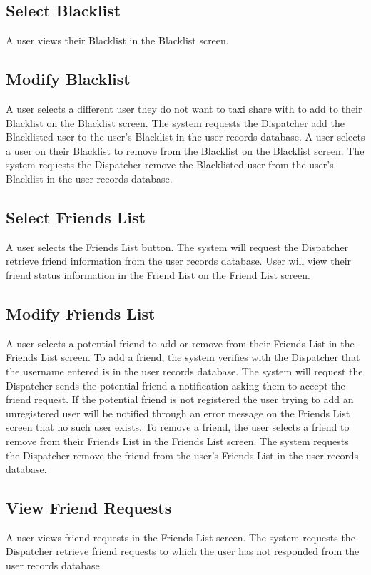\documentclass[english]{article}
\begin{document}
\subsection{Select Blacklist}
A user views their Blacklist in the Blacklist screen.
\subsection{Modify Blacklist}
A user selects a different user they do not want to taxi share with to add to their Blacklist on the Blacklist screen. The system requests the Dispatcher add the Blacklisted user to the user's Blacklist in the user records database. A user selects a user on their Blacklist to remove from the Blacklist on the Blacklist screen. The system requests the Dispatcher remove the Blacklisted user from the user's Blacklist in the user records database. 
\subsection{Select Friends List}
A user selects the Friends List button. The system will request the Dispatcher retrieve friend information from the user records database. User will view their friend status information in the Friend List on the Friend List screen. 
\subsection{Modify Friends List}
A user selects a potential friend to add or remove from their Friends List in the Friends List screen. To add a friend, the system verifies with the Dispatcher that the username entered is in the user records database. The system will request the Dispatcher sends the potential friend a notification asking them to accept the friend request. If the potential friend is not registered the user trying to add an unregistered user will be notified through an error message on the Friends List screen that no such user exists. To remove a friend, the user selects a friend to remove from their Friends List in the Friends List screen. The system requests the Dispatcher remove the friend from the user's Friends List in the user records database.  
\subsection{View Friend Requests}
A user views friend requests in the Friends List screen. The system requests the Dispatcher retrieve friend requests to which the user has not responded from the user records database.
\end{document}
